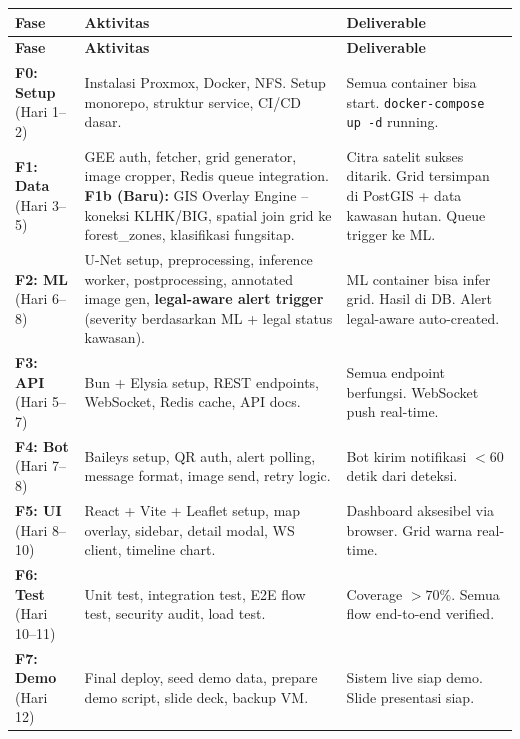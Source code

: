 \documentclass[11pt,a4paper]{article}
\begin{document}
\begin{longtable}{p{2.5cm} p{5cm} p{5cm}}
    \toprule
    \textbf{Fase} & \textbf{Aktivitas} & \textbf{Deliverable} \\
    \midrule
    \endfirsthead
    \toprule
    \textbf{Fase} & \textbf{Aktivitas} & \textbf{Deliverable} \\
    \midrule
    \endhead
    \hline
    \endfoot
    \bottomrule
    \endlastfoot

    \textbf{F0: Setup}
    (Hari 1--2)
    & Instalasi Proxmox, Docker, NFS. Setup monorepo, struktur service, CI/CD dasar.
    & Semua container bisa start. \texttt{docker-compose up -d} running.

    \\
    \textbf{F1: Data}
    (Hari 3--5)
    & GEE auth, fetcher, grid generator, image cropper, Redis queue integration. \newline
      \textbf{F1b (Baru):} GIS Overlay Engine -- koneksi KLHK/BIG, spatial join grid ke forest_zones, klasifikasi fungsitap.
    & Citra satelit sukses ditarik. Grid tersimpan di PostGIS + data kawasan hutan. Queue trigger ke ML.

    \\
    \textbf{F2: ML}
    (Hari 6--8)
    & U-Net setup, preprocessing, inference worker, postprocessing, annotated image gen, \textbf{legal-aware alert trigger} (severity berdasarkan ML + legal status kawasan).
    & ML container bisa infer grid. Hasil di DB. Alert legal-aware auto-created.

    \\
    \textbf{F3: API}
    (Hari 5--7)
    & Bun + Elysia setup, REST endpoints, WebSocket, Redis cache, API docs.
    & Semua endpoint berfungsi. WebSocket push real-time.

    \\
    \textbf{F4: Bot}
    (Hari 7--8)
    & Baileys setup, QR auth, alert polling, message format, image send, retry logic.
    & Bot kirim notifikasi $<60$ detik dari deteksi.

    \\
    \textbf{F5: UI}
    (Hari 8--10)
    & React + Vite + Leaflet setup, map overlay, sidebar, detail modal, WS client, timeline chart.
    & Dashboard aksesibel via browser. Grid warna real-time.

    \\
    \textbf{F6: Test}
    (Hari 10--11)
    & Unit test, integration test, E2E flow test, security audit, load test.
    & Coverage $>70\%$. Semua flow end-to-end verified.

    \\
    \textbf{F7: Demo}
    (Hari 12)
    & Final deploy, seed demo data, prepare demo script, slide deck, backup VM.
    & Sistem live siap demo. Slide presentasi siap.

    \\
\end{longtable}
\end{document}
